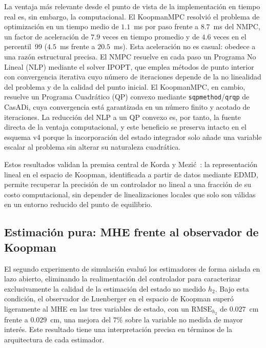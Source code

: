 \documentclass[12pt,letterpaper]{article}
\begin{document}
La ventaja más relevante desde el punto de vista de la 
implementación en tiempo real es, sin embargo, la computacional. 
El KoopmanMPC resolvió el problema de optimización en un tiempo 
medio de $1.1$~ms por paso frente a $8.7$~ms del NMPC, un factor
de aceleración de $7.9$ veces en tiempo promedio y de $4.6$ veces
en el percentil~99 ($4.5$~ms frente a $20.5$~ms). Esta aceleración 
no es casual: obedece a una razón estructural precisa. El NMPC 
resuelve en cada paso un Programa No Lineal (NLP) mediante el solver 
IPOPT, que emplea métodos de punto interior con convergencia 
iterativa cuyo número de iteraciones depende de la no linealidad 
del problema y de la calidad del punto inicial. El KoopmanMPC, en 
cambio, resuelve un Programa Cuadrático (QP) convexo mediante 
\texttt{sqpmethod}/\texttt{qrqp} de CasADi, cuya convergencia está 
garantizada en un número finito y acotado de iteraciones. La 
reducción del NLP a un QP convexo es, por tanto, la fuente directa 
de la ventaja computacional, y este beneficio se preserva intacto 
en el esquema v4 porque la incorporación del estado integrador solo 
añade una variable escalar al problema sin alterar su naturaleza 
cuadrática.

Estos resultados validan la premisa central de Korda y 
Mezić~\cite{korda2018}: la representación lineal en el espacio de 
Koopman, identificada a partir de datos mediante EDMD, permite 
recuperar la precisión de un controlador no lineal a una fracción 
de su costo computacional, sin depender de linealizaciones locales 
que solo son válidas en un entorno reducido del punto de equilibrio.

\subsection{Estimación pura: MHE frente al observador de Koopman}
\label{sec:analisis_est}

El segundo experimento de simulación evaluó los estimadores de forma 
aislada en lazo abierto, eliminando la realimentación del controlador 
para caracterizar exclusivamente la calidad de la estimación del 
estado no medido $h_2$. Bajo esta condición, el observador de 
Luenberger en el espacio de Koopman superó ligeramente al MHE en 
las tres variables de estado, con un $\mathrm{RMSE}_{h_2}$ de 
$0.027$~cm frente a $0.029$~cm, una mejora del $7\%$ sobre la 
variable no medida de mayor interés. Este resultado tiene una 
interpretación precisa en términos de la arquitectura de cada 
estimador.
\end{document}
